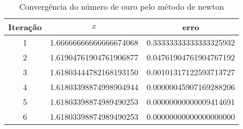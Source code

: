 \begin{table}[H]
	\centering
	\begin{tabular}{|c|c|c|}
		\hline
		Iteração & $x$ & erro \\
		\hline
		1 & 1.66666666666666674068 & 0.33333333333333325932 \\
		\hline
		2 & 1.61904761904761906877 & 0.04761904761904767192 \\
		\hline
		3 & 1.61803444782168193150 & 0.00101317122593713727 \\
		\hline
		4 & 1.61803398874998904944 & 0.00000045907169288206 \\
		\hline
		5 & 1.61803398874989490253 & 0.00000000000009414691 \\
		\hline
		6 & 1.61803398874989490253 & 0.00000000000000000000 \\
		\hline
	 \end{tabular}
	\label{table:phi-newton}
	\caption{Convergência do número de ouro pelo método de newton}
\end{table}

